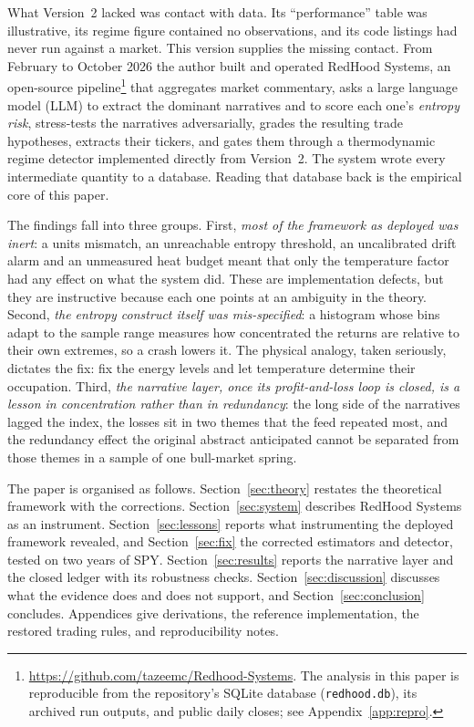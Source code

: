 \documentclass[11pt]{article}
\begin{document}
What Version~2 lacked was contact with data. Its ``performance'' table was illustrative, its regime figure contained no observations, and its code listings had never run against a market. This version supplies the missing contact. From February to October 2026 the author built and operated RedHood Systems, an open-source pipeline\footnote{\url{https://github.com/tazeemc/Redhood-Systems}. The analysis in this paper is reproducible from the repository's SQLite database (\texttt{redhood.db}), its archived run outputs, and public daily closes; see Appendix~\ref{app:repro}.} that aggregates market commentary, asks a large language model (LLM) to extract the dominant narratives and to score each one's \emph{entropy risk}, stress-tests the narratives adversarially, grades the resulting trade hypotheses, extracts their tickers, and gates them through a thermodynamic regime detector implemented directly from Version~2. The system wrote every intermediate quantity to a database. Reading that database back is the empirical core of this paper.

The findings fall into three groups. First, \emph{most of the framework as deployed was inert}: a units mismatch, an unreachable entropy threshold, an uncalibrated drift alarm and an unmeasured heat budget meant that only the temperature factor had any effect on what the system did. These are implementation defects, but they are instructive because each one points at an ambiguity in the theory. Second, \emph{the entropy construct itself was mis-specified}: a histogram whose bins adapt to the sample range measures how concentrated the returns are relative to their own extremes, so a crash lowers it. The physical analogy, taken seriously, dictates the fix: fix the energy levels and let temperature determine their occupation. Third, \emph{the narrative layer, once its profit-and-loss loop is closed, is a lesson in concentration rather than in redundancy}: the long side of the narratives lagged the index, the losses sit in two themes that the feed repeated most, and the redundancy effect the original abstract anticipated cannot be separated from those themes in a sample of one bull-market spring.

The paper is organised as follows. Section~\ref{sec:theory} restates the theoretical framework with the corrections. Section~\ref{sec:system} describes RedHood Systems as an instrument. Section~\ref{sec:lessons} reports what instrumenting the deployed framework revealed, and Section~\ref{sec:fix} the corrected estimators and detector, tested on two years of SPY. Section~\ref{sec:results} reports the narrative layer and the closed ledger with its robustness checks. Section~\ref{sec:discussion} discusses what the evidence does and does not support, and Section~\ref{sec:conclusion} concludes. Appendices give derivations, the reference implementation, the restored trading rules, and reproducibility notes.
\end{document}
